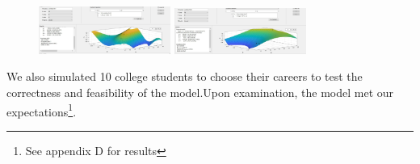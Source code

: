 \documentclass[12pt]{article}
\begin{document}
\begin{figure}[htbp]
{\begin{minipage}[t]{0.3\linewidth}
    \end{minipage}
    }%
    {
    \begin{minipage}[t]{0.3\linewidth}
    \centering
    \includegraphics[width=1.7in]{figure/pict5.jpg}
    \end{minipage}
    }
    {
    \begin{minipage}[t]{0.3\linewidth}
    \centering
    \includegraphics[width=1.7in]{figure/pict6.jpg}
    \end{minipage}
    }
    
    \end{figure}
We also simulated 10 college students to choose their careers to test the correctness and feasibility of the model.Upon examination, the model met our expectations\footnote[1]{See appendix D for results}.
\end{document}
